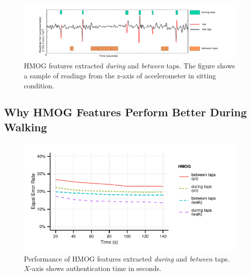 %

%
%
%
%
%


%
%

%


%

%

%

%

%

%

%

%

%
%

%
%


%



%
%
%
%
%
%
%
%
%
%
%
%
%
%
%
%
%
%
%




%
%

\begin{figure}[t]
\includegraphics[width=1\linewidth]{plots/betweenExplainedFinal.pdf}
%
%
%
%
\caption[]{HMOG features extracted {\em during} and {\em between} taps. The figure shows a sample of readings from the z-axis of accelerometer in sitting condition.}
\label{fig:betweenExplained}
\end{figure}








\subsection{Why HMOG Features Perform Better During Walking}

\begin{figure}[t]
%
\includegraphics[width=1.1\linewidth]{plots_R/auth_between_taps.pdf}
\caption[]{Performance of HMOG features extracted {\em during}  and {\em between} taps. $X$-axis shows authentication time in seconds.}
\label{fig:betweenTapsSM}
%
%
%
%
%
%
\end{figure}

